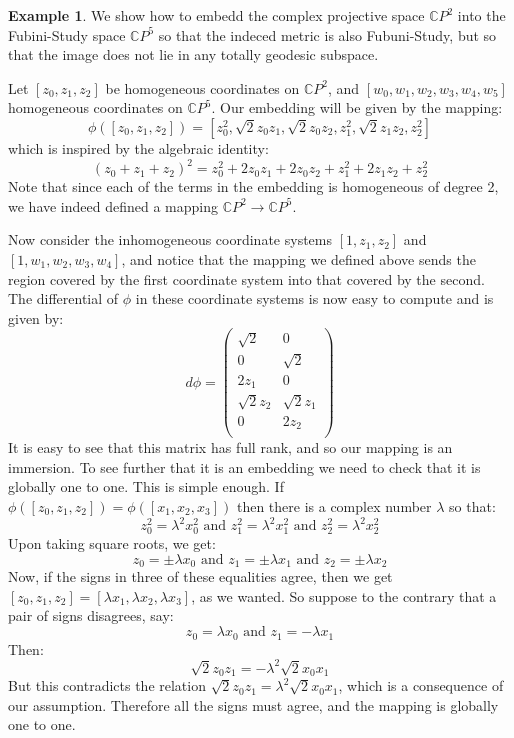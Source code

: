 \documentclass[11pt]{amsart}
\theoremstyle{definition}
\newtheorem{example}[subsection]{Example}
\def \CP{ \mathbb{C}P }
\begin{document}
\begin{example}  We show how to embedd the complex projective space $\CP^2$ into the Fubini-Study space $\CP^5$ so that the indeced metric is also Fubuni-Study, but so that the image does not lie in any totally geodesic subspace.  

Let $[z_0, z_1, z_2]$ be homogeneous coordinates on $\CP^2$, and $[w_0, w_1, w_2, w_3, w_4, w_5]$ homogeneous coordinates on $\CP^5$.  Our embedding will be given by the mapping:
%
$$ \phi( [z_0, z_1, z_2] ) = [z_0^2, \sqrt{2} z_0 z_1, \sqrt{2} z_0 z_2, z_1^2, \sqrt{2} z_1 z_2, z_2^2 ] $$
%
which is inspired by the algebraic identity: 
%
$$ ( z_0 + z_1 + z_2 )^2 = z_0^2 + 2 z_0 z_1 + 2 z_0 z_2 + z_1^2 + 2 z_1 z_2 + z_2^2 $$
%
Note that since each of the terms in the embedding is homogeneous of degree 2, we have indeed defined a mapping $\CP^2 \rightarrow \CP^5$.

Now consider the inhomogeneous coordinate systems $[1,z_1,z_2]$ and $[1,w_1,w_2,w_3,w_4]$, and notice that the mapping we defined above sends the region covered by the first coordinate system into that covered by the second.  The differential of $\phi$ in these coordinate systems is now easy to compute and is given by:
%
$$ d \phi =
\left( \begin{array}{cc} 
\sqrt{2} & 0 \\
0 & \sqrt{2} \\
2 z_1 & 0 \\
\sqrt{2} z_2 & \sqrt{2} z_1 \\
0 & 2 z_2 \\
\end{array} \right) $$
% 
It is easy to see that this matrix has full rank, and so our mapping is an immersion.  To see further that it is an embedding we need to check that it is globally one to one.  This is simple enough.  If $\phi( [z_0, z_1, z_2 ] ) = \phi( [x_1, x_2, x_3] )$ then there is a complex number $\lambda$ so that:
%
$$ z_0^2 = \lambda^2 x_0^2 \text{ and } z_1^2 = \lambda^2 x_1^2 \text{ and } z_2^2 = \lambda^2 x_2^2 $$
%
Upon taking square roots, we get:
%
$$ z_0 = \pm \lambda x_0 \text{ and } z_1 = \pm \lambda x_1 \text{ and } z_2 = \pm \lambda x_2 $$
%
Now, if the signs in three of these equalities agree, then we get $[ z_0, z_1, z_2 ] = [ \lambda x_1, \lambda x_2, \lambda x_3 ]$, as we wanted.  So suppose to the contrary that a pair of signs disagrees, say:
%
$$ z_0 = \lambda x_0 \text{ and } z_1 = - \lambda x_1 $$
%
Then:
%
$$ \sqrt{2} z_0 z_1 = - \lambda^2 \sqrt{2} x_0 x_1 $$
%
But this contradicts the relation $ \sqrt{2} z_0 z_1 = \lambda^2 \sqrt{2} x_0 x_1 $, which is a consequence of our assumption.  Therefore all the signs must agree, and the mapping is globally one to one.  


\end{example}
\end{document}
